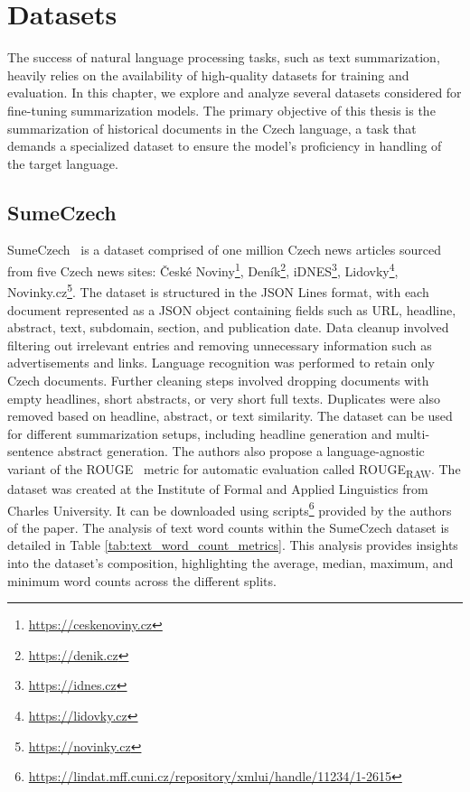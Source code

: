 \documentclass[english, ba, kiv, he, iso690numb, pdf, viewonly]{fasthesis}
\begin{document}
\chapter{Datasets} \label{datasets}
The success of natural language processing tasks, such as text summarization, heavily relies on the availability of high-quality datasets for training and evaluation. In this chapter, we explore and analyze several datasets considered for fine-tuning summarization models. The primary objective of this thesis is the summarization of historical documents in the Czech language, a task that demands a specialized dataset to ensure the model's proficiency in handling of the target language.

\section{SumeCzech} \label{sumeczech-section}
SumeCzech~\cite{straka-etal-2018-sumeczech} is a dataset comprised of one million Czech news articles sourced from five Czech news sites: České Noviny\footnote{\url{https://ceskenoviny.cz}}, Deník\footnote{\url{https://denik.cz}}, iDNES\footnote{\url{https://idnes.cz}}, Lidovky\footnote{\url{https://lidovky.cz}}, Novinky.cz\footnote{\url{https://novinky.cz}}. The dataset is structured in the JSON Lines format, with each document represented as a JSON object containing fields such as URL, headline, abstract, text, subdomain, section, and publication date. Data cleanup involved filtering out irrelevant entries and removing unnecessary information such as advertisements and links. Language recognition was performed to retain only Czech documents. Further cleaning steps involved dropping documents with empty headlines, short abstracts, or very short full texts. Duplicates were also removed based on headline, abstract, or text similarity. The dataset can be used for different summarization setups, including headline generation and multi-sentence abstract generation. The authors also propose a language-agnostic variant of the ROUGE~\cite{lin-2004-rouge} metric for automatic evaluation called ROUGE\textsubscript{RAW}. The dataset was created at the Institute of Formal and Applied Linguistics from Charles University. It can be downloaded using scripts\footnote{\url{https://lindat.mff.cuni.cz/repository/xmlui/handle/11234/1-2615}} provided by the authors of the paper. The analysis of text word counts within the SumeCzech dataset is detailed in Table \ref{tab:text_word_count_metrics}. This analysis provides insights into the dataset's composition, highlighting the average, median, maximum, and minimum word counts across the different splits.
\end{document}
